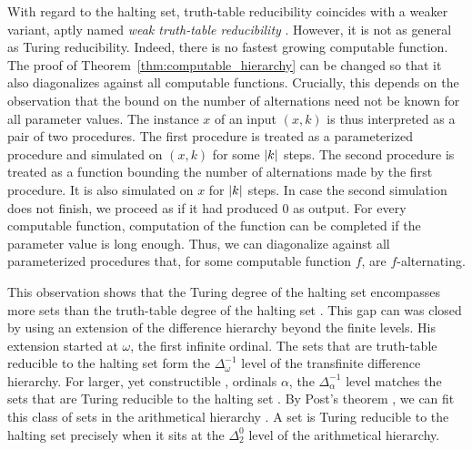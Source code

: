 With regard to the halting set, truth-table reducibility coincides with a weaker variant, aptly named \emph{weak truth-table reducibility} \parencite{odifreddi1992classical,downey2010algorithmic}.
However, it is not as general as Turing reducibility.
Indeed, there is no fastest growing computable function.
The proof of Theorem~\ref{thm:computable_hierarchy} can be changed so that it also diagonalizes against all computable functions.
Crucially, this depends on the observation that the bound on the number of alternations need not be known for all parameter values.
The instance $x$ of an input $(x, k)$ is thus interpreted as a pair of two procedures.
The first procedure is treated as a parameterized procedure and simulated on $(x, k)$ for some ${\lvert k\rvert}$ steps.
The second procedure is treated as a function bounding the number of alternations made by the first procedure.
It is also simulated on $x$ for ${\lvert k\rvert}$ steps.
In case the second simulation does not finish, we proceed as if it had produced $0$ as output.
For every computable function, computation of the function can be completed if the parameter value is long enough.
Thus, we can diagonalize against all parameterized procedures that, for some computable function $f$, are $f$-alternating.

This observation shows that the Turing degree of the halting set encompasses more sets than the truth-table degree of the halting set \parencite{epstein1981hierarchies,arslanov1997degree,downey2010algorithmic}.
This gap can was closed by \textcite{ershov1968hierarchyii} using an extension of the difference hierarchy beyond the finite levels.
His extension started at $\omega$, the first infinite ordinal.
The sets that are truth-table reducible to the halting set form the $\Delta^{-1}_\omega$ level of the transfinite difference hierarchy.
For larger, yet constructible \parencite{rogers1967theory}, ordinals $\alpha$, the $\Delta^{-1}_\alpha$ level matches the sets that are Turing reducible to the halting set \parencite{ershov1968hierarchyii,epstein1981hierarchies}.
By Post's theorem \parencite{post1948degrees,rogers1967theory}, we can fit this class of sets in the arithmetical hierarchy \parencite{rogers1967theory,odifreddi1992classical}.
A set is Turing reducible to the halting set precisely when it sits at the $\Delta^0_2$ level of the arithmetical hierarchy.

